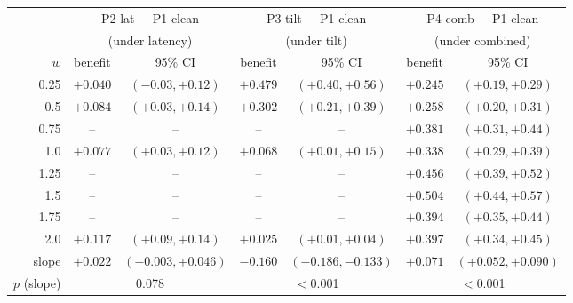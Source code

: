 \begin{tabular}{r cc cc cc}
\toprule
& \multicolumn{2}{c}{P2-lat $-$ P1-clean} & \multicolumn{2}{c}{P3-tilt $-$ P1-clean} & \multicolumn{2}{c}{P4-comb $-$ P1-clean} \\
& \multicolumn{2}{c}{(under latency)} & \multicolumn{2}{c}{(under tilt)} & \multicolumn{2}{c}{(under combined)} \\
\cmidrule(lr){2-3}\cmidrule(lr){4-5}\cmidrule(lr){6-7}
$w$ & benefit & 95\% CI & benefit & 95\% CI & benefit & 95\% CI \\
\midrule
0.25 & $+0.040$ & $(-0.03,+0.12)$ & $\mathbf{+0.479}$ & $(+0.40,+0.56)$ & $\mathbf{+0.245}$ & $(+0.19,+0.29)$ \\
0.5 & $\mathbf{+0.084}$ & $(+0.03,+0.14)$ & $\mathbf{+0.302}$ & $(+0.21,+0.39)$ & $\mathbf{+0.258}$ & $(+0.20,+0.31)$ \\
0.75 & -- & -- & -- & -- & $\mathbf{+0.381}$ & $(+0.31,+0.44)$ \\
1.0 & $\mathbf{+0.077}$ & $(+0.03,+0.12)$ & $+0.068$ & $(+0.01,+0.15)$ & $\mathbf{+0.338}$ & $(+0.29,+0.39)$ \\
1.25 & -- & -- & -- & -- & $\mathbf{+0.456}$ & $(+0.39,+0.52)$ \\
1.5 & -- & -- & -- & -- & $\mathbf{+0.504}$ & $(+0.44,+0.57)$ \\
1.75 & -- & -- & -- & -- & $\mathbf{+0.394}$ & $(+0.35,+0.44)$ \\
2.0 & $\mathbf{+0.117}$ & $(+0.09,+0.14)$ & $\mathbf{+0.025}$ & $(+0.01,+0.04)$ & $\mathbf{+0.397}$ & $(+0.34,+0.45)$ \\
\midrule
slope & $+0.022$ & $(-0.003,+0.046)$ & $-0.160$ & $(-0.186,-0.133)$ & $+0.071$ & $(+0.052,+0.090)$ \\
$p$ (slope) & \multicolumn{2}{c}{0.078} & \multicolumn{2}{c}{$<$0.001} & \multicolumn{2}{c}{$<$0.001} \\
\bottomrule
\end{tabular}
